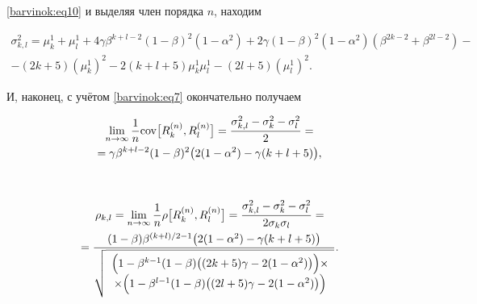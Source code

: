 \eqref{barvinok:eq10} и выделяя член порядка $n$, находим

\begin{multline}

\label{barvinok:eq11}

\sigma_{k,l}^2 =\mu_k^1 +\mu_l^1 +4\gamma

\beta^{k+l-2}(1-\beta)^2(1-\alpha ^2)+2\gamma (1-\beta)^2(1-\alpha ^2)( \beta ^{2k-2}+\beta ^{2l-2})- \\

 -(2k+5)\left(\mu _k^1 \right)^2-2(k+l+5)\mu _k^1 \mu _l^1 -(2l+5)\left(\mu _l^1\right)^2.

\end{multline}

И, наконец, с учётом \eqref{barvinok:eq7} окончательно получаем

\begin{multline}

\label{barvinok:eq13}

\lim \limits_{n\to \infty }

\frac{1}{n}{\rm cov}\bigl[R_k^{(n)},R_l^{(n)} \bigr]=\frac{\sigma

_{k,l}^2 -\sigma _k^2 -\sigma _l^2 }{2}= \\

=\gamma \beta

^{k+l-2}(1-\beta)^2\bigl(2(1-\alpha ^2)-\gamma (k+l+5)\bigr),

\end{multline} 



\pagebreak



$\,$



\vspace{-10mm}



\begin{multline}

\label{barvinok:eq13}

\rho _{k,l} =

\lim \limits_{n\to \infty} \frac{1}{n}

\rho \bigl[ R_k^{(n)} ,R_l^{(n)} \bigr]=

\frac{\sigma _{k,l}^2 -\sigma _k^2 -\sigma _l^2 }{2\sigma _k \sigma _l }= \\ 

 =\frac{(1-\beta)\beta^{({k+l})/{2}-1}\bigl(2(1-\alpha^2)-\gamma (k+l+5)\bigr)}{\sqrt {

\begin{array}{c}

\Bigl(1-\beta ^{k-1}(1-\beta)\bigl((2k+5)\gamma -2(1-\alpha ^2)\bigr)\Bigr) \times \\ 

\times 

\Bigl(1-\beta ^{l-1}(1-\beta)\bigl((2l+5)\gamma -2(1-\alpha ^2)\bigr)\Bigr)

\end{array} 

}}.

\end{multline}

